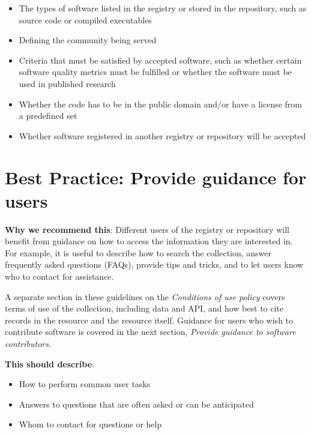 \documentclass[11pt]{article}
\begin{document}
\begin{itemize}
\item The types of software listed in the registry or stored in the repository, such as source code or compiled executables

\item Defining the community being served

\item Criteria that must be satisfied by accepted software, such as whether certain software quality metrics must be fulfilled or whether the software must be used in published research

\item Whether the code has to be in the public domain and/or have a license from a predefined set

\item Whether software registered in another registry or repository will be accepted

\end{itemize}


\section{Best Practice: Provide guidance for users}
\label{best-practice-provide-guidance-for-users}

\textbf{Why we recommend this}: Different users of the registry or repository will benefit from guidance on how to access the information they are interested in. For example, it is useful to describe how to search the collection, answer frequently asked questions (FAQs), provide tips and tricks, and to let users know who to contact for assistance.

A separate section in these guidelines on the \emph{Conditions of use policy} covers terms of use of the collection, including data and API, and how best to cite records in the resource and the resource itself. Guidance for users who wish to contribute software is covered in the next section, \emph{Provide guidance to software contributors}.

\textbf{This should describe}:

\begin{itemize}
\item How to perform common user tasks

\item Answers to questions that are often asked or can be anticipated

\item Whom to contact for questions or help

\end{itemize}
\end{document}
